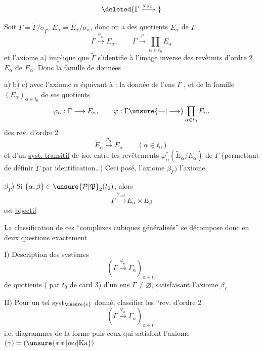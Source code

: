 
\[
\deleted{\Gamma\xrightarrow{\varphi_{\alpha\beta}}{}}
\]

Soit  $\Gamma=\widetilde\Gamma/\sigma_{\widetilde\Gamma}$, $E_\alpha=\widetilde E_\alpha/\sigma_\alpha$, donc on a des quotients $E_\alpha$ de $\Gamma$
\[
\Gamma\xrightarrow{\varphi_\alpha} E_\alpha,\qquad\Gamma\xrightarrow{\varphi}\prod_{\alpha\in t_0}E_\alpha
\]
et l'axiome a) implique que \inserted{$\forall\alpha$,} $\widetilde\Gamma$ s'identifie à l'image inverse des revêtmts d'ordre 2 $\overline E_\alpha$ de $E_\alpha$. Donc la famille de données

a) b) c) avec l'axiome $\alpha$ équivaut à : la donnée de l'ens $\Gamma$ \inserted{$\ne\varnothing$}, et de la famille $(E_\alpha)_{\alpha\in t_0}$ de ses quotients
\[
\varphi_\alpha:\Gamma\longrightarrow E_\alpha,\qquad
\varphi:\Gamma\unsure{\text{---}|\longrightarrow}\prod_{\alpha\in t_0}E_\alpha,
\]
 des rev. d'ordre 2
\[
\widetilde E_\alpha\xrightarrow{p_\alpha} E_\alpha\qquad(\alpha\in t_0)
\]
et d'un \uline{syst. transitif} de \inserted{$\Gamma$-}iso. entre les revêtements $\varphi_\alpha^*(\widetilde E_\alpha/E_\alpha)$ de $\Gamma$ (permettant de définir $\widetilde\Gamma$ par identification\ldots) Ceci posé, l'axiome $\beta_{\widetilde\Gamma})$  l'axiome

$\beta_\Gamma$) Si $\{\alpha,\beta\}\in\unsure{\mathcal P|\mathfrak P}_2(t_0)$, alors
\[
\Gamma\xrightarrow{\varphi_{\alpha\beta}}E_\alpha\times E_\beta
\]
est \uline{bijectif}

La classification de ces ``complexes cubiques généralisés''  se décompose donc en deux questions exactement

I) Description des systèmes
\[
\left(\Gamma\xrightarrow{\varphi_\alpha}\Gamma_\alpha\right)_{\alpha\in t_0}
\]
de quotients ( par $t_0$ de card 3) d'un ens $\Gamma\ne\varnothing$, satisfaisant l'axiome $\beta_\Gamma$

II) Pour un tel syst$_{\unsure{e}}$ donné, classifier les ``rev. d'ordre 2 
\[
\left(\Gamma\xrightarrow{\varphi_\alpha}\Gamma_\alpha\right)_{\alpha\in t_0}
\]
i.e.   diagrammes  de la forme
puis ceux qui satisfont l'axiome $(\gamma)=(\unsure{**|\alpha\alpha|\mathrm{Ka}})$


